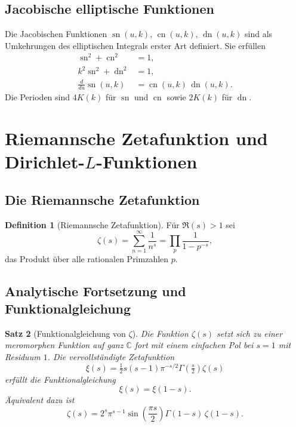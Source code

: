 \documentclass[12pt,a4paper]{amsart}
\newtheorem{theorem}{Satz}[section]
\theoremstyle{definition}
\newtheorem{definition}[theorem]{Definition}
\begin{document}
\subsection{Jacobische elliptische Funktionen}

Die Jacobischen Funktionen \(\operatorname{sn}(u,k)\), \(\operatorname{cn}(u,k)\),
\(\operatorname{dn}(u,k)\) sind als Umkehrungen des elliptischen Integrals erster Art
definiert.  Sie erfüllen
\begin{align*}
  \operatorname{sn}^2 + \operatorname{cn}^2 &= 1, \\
  k^2\operatorname{sn}^2 + \operatorname{dn}^2 &= 1, \\
  \frac{d}{du}\operatorname{sn}(u,k) &= \operatorname{cn}(u,k)\,\operatorname{dn}(u,k).
\end{align*}
Die Perioden sind \(4K(k)\) für \(\operatorname{sn}\) und \(\operatorname{cn}\) sowie
\(2K(k)\) für \(\operatorname{dn}\).

\section{Riemannsche Zetafunktion und Dirichlet-\texorpdfstring{$L$}{L}-Funktionen}
\label{sec:zeta}

\subsection{Die Riemannsche Zetafunktion}

\begin{definition}[Riemannsche Zetafunktion]
Für \(\Re(s) > 1\) sei
\[
  \zeta(s) = \sum_{n=1}^\infty \frac{1}{n^s} = \prod_p \frac{1}{1-p^{-s}},
\]
das Produkt über alle rationalen Primzahlen \(p\).
\end{definition}

\subsection{Analytische Fortsetzung und Funktionalgleichung}

\begin{theorem}[Funktionalgleichung von \(\zeta\)]\label{thm:zeta_functional_de}
Die Funktion \(\zeta(s)\) setzt sich zu einer meromorphen Funktion auf ganz \(\mathbb{C}\)
fort mit einem einfachen Pol bei \(s = 1\) mit Residuum \(1\).
Die vervollständigte Zetafunktion
\[
  \xi(s) = \tfrac{1}{2}s(s-1)\pi^{-s/2}\Gamma\!\left(\tfrac{s}{2}\right)\zeta(s)
\]
erfüllt die Funktionalgleichung
\[
  \xi(s) = \xi(1-s).
\]
Äquivalent dazu ist
\[
  \zeta(s) = 2^s\pi^{s-1}\sin\!\left(\frac{\pi s}{2}\right)\Gamma(1-s)\,\zeta(1-s).
\]
\end{theorem}
\end{document}
